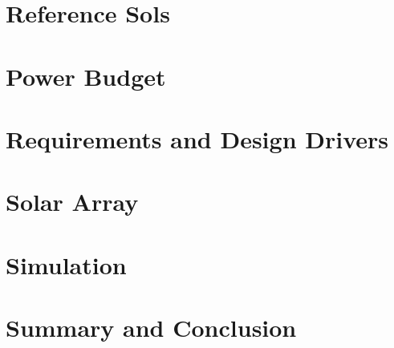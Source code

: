 

\section{Reference Sols}
\label{sec:Design:ReferenceSols}


\section{Power Budget}
\label{sec:Design:PowerBudget}


\section{Requirements and Design Drivers}
\label{sec:Design:RequirementsAndDesignDrivers}


\section{Solar Array}
\label{sec:Design:SolarArray}


\section{Simulation}
\label{sec:Design:Simulation}


\section{Summary and Conclusion}
\label{sec:Design:SummaryAndConclusion}

